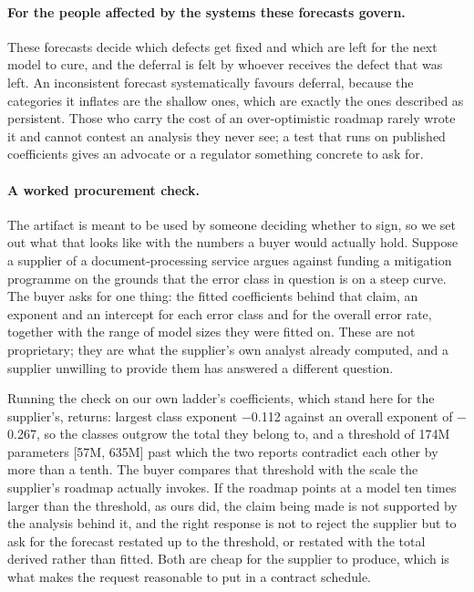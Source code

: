 \documentclass[11pt]{article}
\begin{document}
\paragraph{For the people affected by the systems these forecasts govern.}
These forecasts decide which defects get fixed and which are left for the next model
to cure, and the deferral is felt by whoever receives the defect that was left. An
inconsistent forecast systematically favours deferral, because the categories it
inflates are the shallow ones, which are exactly the ones described as persistent.
Those who carry the cost of an over-optimistic roadmap rarely wrote it and cannot
contest an analysis they never see; a test that runs on published coefficients gives
an advocate or a regulator something concrete to ask for.

\paragraph{A worked procurement check.}
The artifact is meant to be used by someone deciding whether to sign, so we set out
what that looks like with the numbers a buyer would actually hold. Suppose a
supplier of a document-processing service argues against funding a mitigation
programme on the grounds that the error class in question is on a steep curve. The
buyer asks for one thing: the fitted coefficients behind that claim, an exponent and
an intercept for each error class and for the overall error rate, together with the
range of model sizes they were fitted on. These are not proprietary; they are what
the supplier's own analyst already computed, and a supplier unwilling to provide
them has answered a different question.

Running the check on our own ladder's coefficients, which stand here for the
supplier's, returns: largest class exponent $-$0.112 against an overall
exponent of $-$0.267, so the classes outgrow the total they belong to,
and a threshold of 174M parameters
[57M, 635M] past which the two reports
contradict each other by more than a tenth. The buyer compares that threshold with
the scale the supplier's roadmap actually invokes. If the roadmap points at a model
ten times larger than the threshold, as ours did, the claim being made is not
supported by the analysis behind it, and the right response is not to reject the
supplier but to ask for the forecast restated up to the threshold, or restated with
the total derived rather than fitted. Both are cheap for the supplier to produce,
which is what makes the request reasonable to put in a contract schedule.
\end{document}
